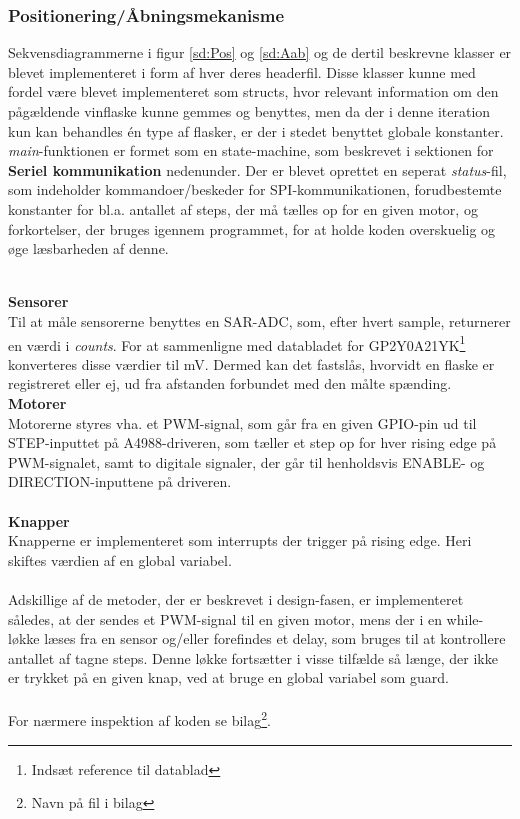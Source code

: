 \subsubsection{Positionering/Åbningsmekanisme}
Sekvensdiagrammerne i figur \ref{sd:Pos} og \ref{sd:Aab} og de dertil beskrevne klasser er blevet implementeret i form af hver deres headerfil. Disse klasser kunne med fordel være blevet implementeret som structs, hvor relevant information om den pågældende vinflaske kunne gemmes og benyttes, men da der i denne iteration kun kan behandles én type af flasker, er der i stedet benyttet globale konstanter. \textit{main}-funktionen er formet som en state-machine, som beskrevet i sektionen for \textbf{Seriel kommunikation} nedenunder. Der er blevet oprettet en seperat \textit{status}-fil, som indeholder kommandoer/beskeder for SPI-kommunikationen, forudbestemte konstanter for bl.a. antallet af steps, der må tælles op for en given motor, og forkortelser, der bruges igennem programmet, for at holde koden overskuelig og øge læsbarheden af denne.

\\
\textbf{Sensorer} \\
Til at måle sensorerne benyttes en SAR-ADC, som, efter hvert sample, returnerer en værdi i \textit{counts}. For at sammenligne med databladet for GP2Y0A21YK\footnote{Indsæt reference til datablad} konverteres disse værdier til mV. Dermed kan det fastslås, hvorvidt en flaske er registreret eller ej, ud fra afstanden forbundet med den målte spænding.
\\
\textbf{Motorer} \\
Motorerne styres vha. et PWM-signal, som går fra en given GPIO-pin ud til STEP-inputtet på A4988-driveren, som tæller et step op for hver rising edge på PWM-signalet, samt to digitale signaler, der går til henholdsvis ENABLE- og DIRECTION-inputtene på driveren. \\
\\
\textbf{Knapper} \\
Knapperne er implementeret som interrupts der trigger på rising edge. Heri skiftes værdien af en global variabel. \\
\\
Adskillige af de metoder, der er beskrevet i design-fasen, er implementeret således, at der sendes et PWM-signal til en given motor, mens der i en while-løkke læses fra en sensor og/eller forefindes et delay, som bruges til at kontrollere antallet af tagne steps. Denne løkke fortsætter i visse tilfælde så længe, der ikke er trykket på en given knap, ved at bruge en global variabel som guard.
\\
\\
For nærmere inspektion af koden se bilag\footnote{Navn på fil i bilag}.